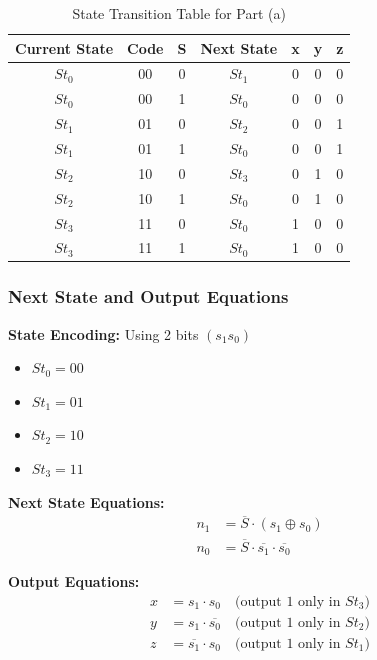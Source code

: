 \documentclass[12pt,a4paper]{article}
\begin{document}
\begin{table}[H]
\centering
\caption{State Transition Table for Part (a)}
\begin{tabular}{c|c|c|c|ccc}
\toprule
\textbf{Current State} & \textbf{Code} & \textbf{S} & \textbf{Next State} & \textbf{x} & \textbf{y} & \textbf{z} \\
\midrule
$St_0$ & 00 & 0 & $St_1$ & 0 & 0 & 0 \\
$St_0$ & 00 & 1 & $St_0$ & 0 & 0 & 0 \\
$St_1$ & 01 & 0 & $St_2$ & 0 & 0 & 1 \\
$St_1$ & 01 & 1 & $St_0$ & 0 & 0 & 1 \\
$St_2$ & 10 & 0 & $St_3$ & 0 & 1 & 0 \\
$St_2$ & 10 & 1 & $St_0$ & 0 & 1 & 0 \\
$St_3$ & 11 & 0 & $St_0$ & 1 & 0 & 0 \\
$St_3$ & 11 & 1 & $St_0$ & 1 & 0 & 0 \\
\bottomrule
\end{tabular}
\end{table}

\subsubsection{Next State and Output Equations}

\textbf{State Encoding:} Using 2 bits $(s_1s_0)$
\begin{itemize}
  \item $St_0 = 00$
  \item $St_1 = 01$
  \item $St_2 = 10$
  \item $St_3 = 11$
\end{itemize}

\textbf{Next State Equations:}
\begin{align}
n_1 &= \overline{S} \cdot (s_1 \oplus s_0) \\
n_0 &= \overline{S} \cdot \overline{s_1} \cdot \overline{s_0}
\end{align}

\textbf{Output Equations:}
\begin{align}
x &= s_1 \cdot s_0 \quad \text{(output 1 only in $St_3$)} \\
y &= s_1 \cdot \overline{s_0} \quad \text{(output 1 only in $St_2$)} \\
z &= \overline{s_1} \cdot s_0 \quad \text{(output 1 only in $St_1$)}
\end{align}
\end{document}
